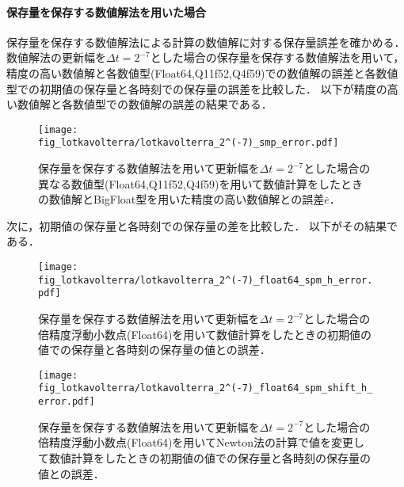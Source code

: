 \paragraph*{保存量を保存する数値解法を用いた場合}
保存量を保存する数値解法による計算の数値解に対する保存量誤差を確かめる．
数値解法の更新幅を$\Delta t = 2^{-7}$とした場合の保存量を保存する数値解法を用いて，精度の高い数値解と各数値型(Float64,Q11f52,Q4f59)での数値解の誤差と各数値型での初期値の保存量と各時刻での保存量の誤差を比較した．
以下が精度の高い数値解と各数値型での数値解の誤差の結果である．

\begin{figure}[H]
    \centering
    \begin{minipage}[b]{0.9\columnwidth}
        \centering
        \texttt{[image: fig\_lotkavolterra/lotkavolterra\_2^(-7)\_smp\_error.pdf]}
        \caption{保存量を保存する数値解法を用いて更新幅を$\Delta t = 2^{-7}$とした場合の異なる数値型(Float64,Q11f52,Q4f59)を用いて数値計算をしたときの数値解とBigFloat型を用いた精度の高い数値解との誤差$\bar{e}$．}
    \end{minipage}
\end{figure}

次に，初期値の保存量と各時刻での保存量の差を比較した．
以下がその結果である．

\begin{figure}[H]
    \centering
    \begin{minipage}[b]{0.48\columnwidth}
        \centering
        \texttt{[image: fig\_lotkavolterra/lotkavolterra\_2^(-7)\_float64\_spm\_h\_error.pdf]}
        \caption{保存量を保存する数値解法を用いて更新幅を$\Delta t = 2^{-7}$とした場合の倍精度浮動小数点(Float64)を用いて数値計算をしたときの初期値の値での保存量と各時刻の保存量の値との誤差．}
        \label{fig:lotkavolterra_2^(-7)_float64_smp_h_error}
    \end{minipage}
    \hspace{0.01\columnwidth}
    \begin{minipage}[b]{0.48\columnwidth}
        \centering
        \texttt{[image: fig\_lotkavolterra/lotkavolterra\_2^(-7)\_float64\_spm\_shift\_h\_error.pdf]}
        \caption{保存量を保存する数値解法を用いて更新幅を$\Delta t =  2^{-7}$とした場合の倍精度浮動小数点(Float64)を用いてNewton法の計算で値を変更して数値計算をしたときの初期値の値での保存量と各時刻の保存量の値との誤差．}
        \label{fig:lotkavolterra_2^(-7)_float64_smp_shift_h_error}
    \end{minipage}
\end{figure}

